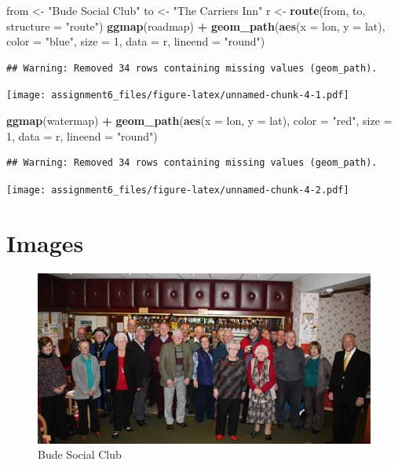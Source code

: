 \documentclass[]{article}
\newenvironment{Shaded}{\begin{snugshade}}{\end{snugshade}}
\newcommand{\KeywordTok}[1]{\textcolor[rgb]{0.13,0.29,0.53}{\textbf{#1}}}
\newcommand{\DataTypeTok}[1]{\textcolor[rgb]{0.13,0.29,0.53}{#1}}
\newcommand{\DecValTok}[1]{\textcolor[rgb]{0.00,0.00,0.81}{#1}}
\newcommand{\StringTok}[1]{\textcolor[rgb]{0.31,0.60,0.02}{#1}}
\newcommand{\OperatorTok}[1]{\textcolor[rgb]{0.81,0.36,0.00}{\textbf{#1}}}
\newcommand{\NormalTok}[1]{#1}
\begin{document}
\begin{Shaded}
\begin{Highlighting}[]
\NormalTok{from <-}\StringTok{ "Bude Social Club"}
\NormalTok{to <-}\StringTok{ "The Carriers Inn"}
\NormalTok{r <-}\StringTok{ }\KeywordTok{route}\NormalTok{(from, to, }\DataTypeTok{structure =} \StringTok{"route"}\NormalTok{)}
\KeywordTok{ggmap}\NormalTok{(roadmap) }\OperatorTok{+}\StringTok{ }
\StringTok{  }\KeywordTok{geom_path}\NormalTok{(}\KeywordTok{aes}\NormalTok{(}\DataTypeTok{x =}\NormalTok{ lon, }\DataTypeTok{y =}\NormalTok{ lat), }\DataTypeTok{color =} \StringTok{"blue"}\NormalTok{, }\DataTypeTok{size =} \DecValTok{1}\NormalTok{, }\DataTypeTok{data =}\NormalTok{ r, }\DataTypeTok{lineend =} \StringTok{"round"}\NormalTok{)}
\end{Highlighting}
\end{Shaded}

\begin{verbatim}
## Warning: Removed 34 rows containing missing values (geom_path).
\end{verbatim}

\texttt{[image: assignment6\_files/figure-latex/unnamed-chunk-4-1.pdf]}

\begin{Shaded}
\begin{Highlighting}[]
\KeywordTok{ggmap}\NormalTok{(watermap) }\OperatorTok{+}\StringTok{ }
\StringTok{  }\KeywordTok{geom_path}\NormalTok{(}\KeywordTok{aes}\NormalTok{(}\DataTypeTok{x =}\NormalTok{ lon, }\DataTypeTok{y =}\NormalTok{ lat), }\DataTypeTok{color =} \StringTok{"red"}\NormalTok{, }\DataTypeTok{size =} \DecValTok{1}\NormalTok{, }\DataTypeTok{data =}\NormalTok{ r, }\DataTypeTok{lineend =} \StringTok{"round"}\NormalTok{)}
\end{Highlighting}
\end{Shaded}

\begin{verbatim}
## Warning: Removed 34 rows containing missing values (geom_path).
\end{verbatim}

\texttt{[image: assignment6\_files/figure-latex/unnamed-chunk-4-2.pdf]}

\section{Images}\label{images}

\begin{figure}
\centering
\includegraphics{Bude Social Club.jpg}
\caption{Bude Social Club}
\end{figure}
\end{document}
